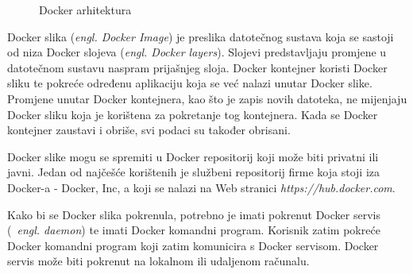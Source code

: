 \begin{figure}[h]
    \centering

    \caption{Docker arhitektura}%
    \label{fig:02docker}
\end{figure}

Docker slika (\textit{engl. Docker Image}) je preslika datotečnog sustava koja se sastoji od niza
Docker slojeva (\textit{engl. Docker layers}). Slojevi predstavljaju promjene u datotečnom sustavu
naspram prijašnjeg sloja. Docker kontejner koristi Docker sliku te pokreće određenu aplikaciju koja
se već nalazi unutar Docker slike. Promjene unutar Docker kontejnera, kao što je zapis novih
datoteka, ne mijenjaju Docker sliku koja je korištena za pokretanje tog kontejnera. Kada se Docker
kontejner zaustavi i obriše, svi podaci su također obrisani.

Docker slike mogu se spremiti u Docker repositorij koji može biti privatni ili javni. Jedan od
najčešće korištenih je službeni repositorij firme koja stoji iza Docker-a - Docker, Inc, a koji se
nalazi na Web stranici \textit{https://hub.docker.com}.

Kako bi se Docker slika pokrenula, potrebno je imati pokrenut Docker servis (~\textit{engl.
daemon}) te imati Docker komandni program. Korisnik zatim pokreće Docker komandni program koji zatim
komunicira s Docker servisom. Docker servis može biti pokrenut na lokalnom ili udaljenom računalu.

